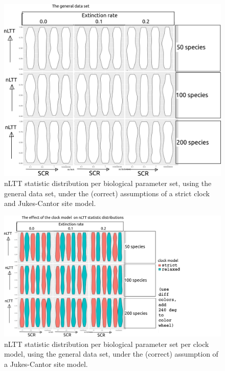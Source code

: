 \begin{figure}[!htbp]
  \includegraphics[width=\textwidth]{fig_general.png}
  \caption{
    nLTT statistic distribution per biological parameter set, using the
    general data set, 
    under the (correct) assumptions of a strict clock and Jukes-Cantor site model.
  }
\end{figure}

\begin{figure}[!htbp]
  \includegraphics[width=\textwidth]{fig_clock_model.png}
  \caption{
    nLTT statistic distribution per biological parameter set per clock model,
    using the general data set, 
    under the (correct) assumption of a Jukes-Cantor site model.
  }
\end{figure}

